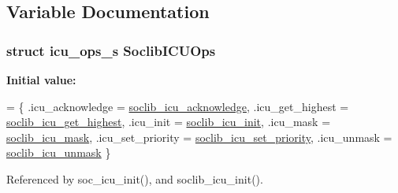 \subsection{Variable Documentation}
\hypertarget{icu_2soclib-icu_8c_a57148fb85883dc5ca0480a7b55398c58}{
\subsubsection[{Soclib\-I\-C\-U\-Ops}]{\setlength{\rightskip}{0pt plus 5cm}struct {\bf icu\-\_\-ops\-\_\-s} Soclib\-I\-C\-U\-Ops}}\label{icu_2soclib-icu_8c_a57148fb85883dc5ca0480a7b55398c58}
{\bfseries Initial value\-:}
\begin{DoxyCode}
= \{
    .icu\_acknowledge = \hyperlink{icu_2soclib-icu_8c_a924a53d9cd3a4685a608fe6ec5efdca8}{soclib\_icu\_acknowledge},
    .icu\_get\_highest = \hyperlink{icu_2soclib-icu_8c_a31bf159c6e02e1717177273e6a74d374}{soclib\_icu\_get\_highest},
    .icu\_init = \hyperlink{icu_2soclib-icu_8c_a291831fe78dd1a558504a84a5685199b}{soclib\_icu\_init},
    .icu\_mask = \hyperlink{icu_2soclib-icu_8c_a97854aad88a8ec5625b03d30cc0246e4}{soclib\_icu\_mask},
    .icu\_set\_priority = \hyperlink{icu_2soclib-icu_8c_a29d2109ae12995fb60a2a9f278281e4f}{soclib\_icu\_set\_priority},
    .icu\_unmask = \hyperlink{icu_2soclib-icu_8c_a7fcbcc6fb620f7a6ed3082b7053ce0e1}{soclib\_icu\_unmask}
\}
\end{DoxyCode}


Referenced by soc\-\_\-icu\-\_\-init(), and soclib\-\_\-icu\-\_\-init().


